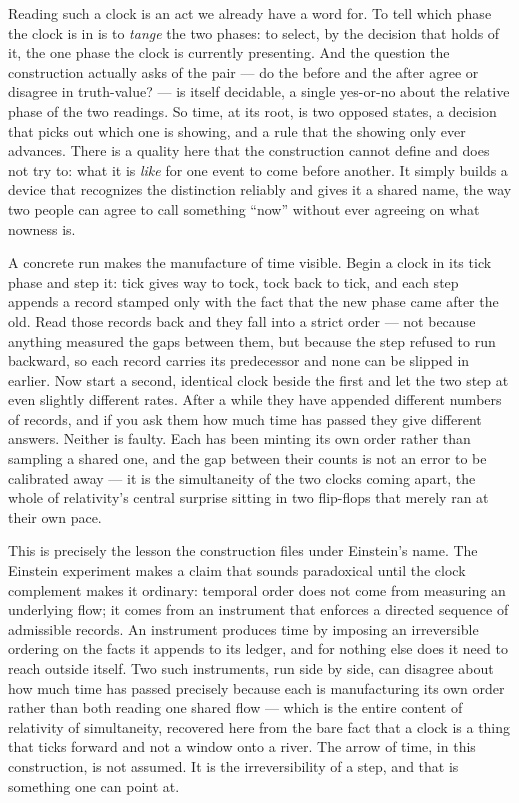 Reading such a clock is an act we already have a word for. To tell which phase the clock is in is to
\emph{tange} the two phases: to select, by the decision that holds of it, the one phase the clock is
currently presenting. And the question the construction actually asks of the pair --- do the before
and the after agree or disagree in truth-value? --- is itself decidable, a single yes-or-no about the
relative phase of the two readings. So time, at its root, is two opposed states, a decision that picks
out which one is showing, and a rule that the showing only ever advances. There is a quality here that
the construction cannot define and does not try to: what it is \emph{like} for one event to come
before another. It simply builds a device that recognizes the distinction reliably and gives it a
shared name, the way two people can agree to call something ``now'' without ever agreeing on what
nowness is.

A concrete run makes the manufacture of time visible. Begin a clock in its tick phase and step it:
tick gives way to tock, tock back to tick, and each step appends a record stamped only with the fact
that the new phase came after the old. Read those records back and they fall into a strict order ---
not because anything measured the gaps between them, but because the step refused to run backward, so
each record carries its predecessor and none can be slipped in earlier. Now start a second, identical
clock beside the first and let the two step at even slightly different rates. After a while they have
appended different numbers of records, and if you ask them how much time has passed they give
different answers. Neither is faulty. Each has been minting its own order rather than sampling a shared
one, and the gap between their counts is not an error to be calibrated away --- it is the simultaneity
of the two clocks coming apart, the whole of relativity's central surprise sitting in two flip-flops
that merely ran at their own pace.

This is precisely the lesson the construction files under Einstein's name. The Einstein experiment
makes a claim that sounds paradoxical until the clock complement makes it ordinary: temporal order
does not come from measuring an underlying flow; it comes from an instrument that enforces a directed
sequence of admissible records. An instrument produces time by imposing an irreversible ordering on
the facts it appends to its ledger, and for nothing else does it need to reach outside itself. Two
such instruments, run side by side, can disagree about how much time has passed precisely because each
is manufacturing its own order rather than both reading one shared flow --- which is the entire content
of relativity of simultaneity, recovered here from the bare fact that a clock is a thing that ticks
forward and not a window onto a river. The arrow of time, in this construction, is not assumed. It is
the irreversibility of a step, and that is something one can point at.

